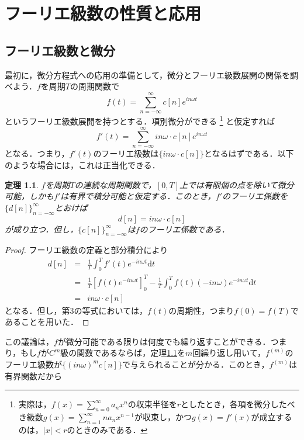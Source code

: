 \documentclass[a4j]{jsbook}
\newtheorem{theorem}{定理}
\numberwithin{theorem}{chapter}  %
\begin{document}
\chapter{フーリエ級数の性質と応用} \label{chap2}
\section{フーリエ級数と微分} \label{sec2-1}
最初に，微分方程式への応用の準備として，微分とフーリエ級数展開の関係を調べよう．\(f\)を周期\(T\)の周期関数で
\begin{equation*}
    f(t)=\sum_{n=-\infty}^\infty c[n]e^{in\omega t}
\end{equation*}
というフーリエ級数展開を持つとする．項別微分ができる
\footnote{
実際は，\(\displaystyle f(x)=\sum_{n=0}^\infty a_nx^n\)の収束半径を\(r\)としたとき，各項を微分したべき級数\(\displaystyle g(x)=\sum_{n=1}^\infty na_nx^{n-1}\)が収束し，かつ\(g(x)=f'(x)\)が成立するのは，\(|x|<r\)のときのみである．
}
と仮定すれば
\begin{equation*}
    f'(t)=\sum_{n=-\infty}^\infty in\omega\cdot c[n]e^{in\omega t}
\end{equation*}
となる．つまり，\(f'(t)\)のフーリエ級数は\(\{in\omega\cdot c[n]\}\)となるはずである．以下のような場合には，これは正当化できる．
\begin{theorem}
\label{th2-1}
\(f\)を周期\(T\)の連続な周期関数で，\([0, T]\)上では有限個の点を除いて微分可能，しかも\(f'\)は有界で積分可能と仮定する．このとき，\(f'\)のフーリエ係数を\(\{d[n]\}_{n=-\infty}^\infty\)とおけば
\begin{equation*}
    d[n]=in\omega\cdot c[n]
\end{equation*}
が成り立つ．但し，\(\{c[n]\}_{n=-\infty}^\infty\)は\(f\)のフーリエ係数である．
\end{theorem}
\begin{proof}
フーリエ級数の定義と部分積分により
\begin{eqnarray*}
d[n]&=&\frac{1}{T}\int_0^T f'(t)e^{-in\omega t}\mathrm{d}t \\
&=&\frac{1}{T}\left[f(t)e^{-in\omega t}\right]_0^T-\frac{1}{T}\int_0^T f(t)(-in\omega)e^{-in\omega t}\mathrm{d}t \\
&=&in\omega\cdot c[n]
\end{eqnarray*}
となる．但し，第3の等式においては，\(f(t)\)の周期性，つまり\(f(0)=f(T)\)であることを用いた．
\end{proof}
この議論は，\(f\)が微分可能である限りは何度でも繰り返すことができる．つまり，もし\(f\)が\(C^m\)級の関数であるならば，定理\ref{th2-1}を\(m\)回繰り返し用いて，\(f^{(m)}\)のフーリエ級数が\(\{(in\omega)^mc[n]\}\)で与えられることが分かる．このとき，\(f^{(m)}\)は有界関数だから
\end{document}
